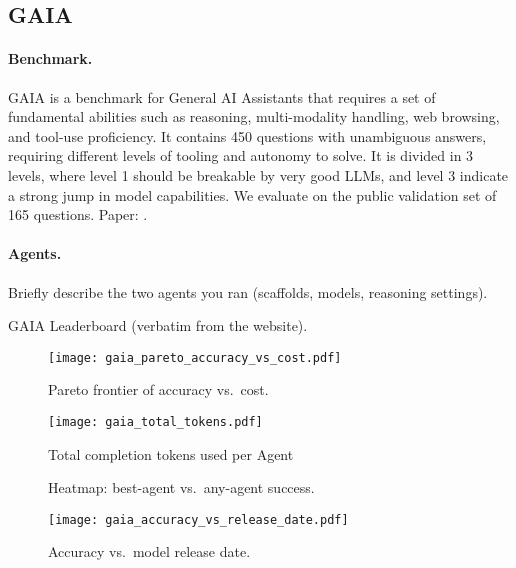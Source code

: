 \subsection{GAIA}\label{app:gaia}

\paragraph{Benchmark.}
GAIA is a benchmark for General AI Assistants that requires a set of fundamental abilities such as reasoning, multi-modality handling, web browsing, and tool-use proficiency. It contains 450 questions with unambiguous answers, requiring different levels of tooling and autonomy to solve. It is divided in 3 levels, where level 1 should be breakable by very good LLMs, and level 3 indicate a strong jump in model capabilities. We evaluate on the public validation set of 165 questions.
Paper: \cite{gaia}.

\paragraph{Agents.}
Briefly describe the two agents you ran (scaffolds, models, reasoning settings).


\begin{table}[t]
  \centering
  \caption{GAIA Leaderboard (verbatim from the website).}
  \label{tab:gaia_full}
  
\end{table}


\begin{figure}[htbp]
  \centering
  \texttt{[image: gaia\_pareto\_accuracy\_vs\_cost.pdf]}
  \caption{Pareto frontier of accuracy vs.\ cost.}
  \label{fig:gaia_pareto}
\end{figure}

\begin{figure}[htbp]
  \centering
  \texttt{[image: gaia\_total\_tokens.pdf]}
  \caption{Total completion tokens used per Agent}
  \label{fig:gaia_tokens}
\end{figure}

\begin{figure*}[t]
  \centering
  \caption{Heatmap: best-agent vs.\ any-agent success.}
  \label{fig:gaia_heatmap}
\end{figure*}

\begin{figure}[htbp]
  \centering
  \texttt{[image: gaia\_accuracy\_vs\_release\_date.pdf]}
  \caption{Accuracy vs.\ model release date.}
  \label{fig:gaia_release}
\end{figure}

\clearpage